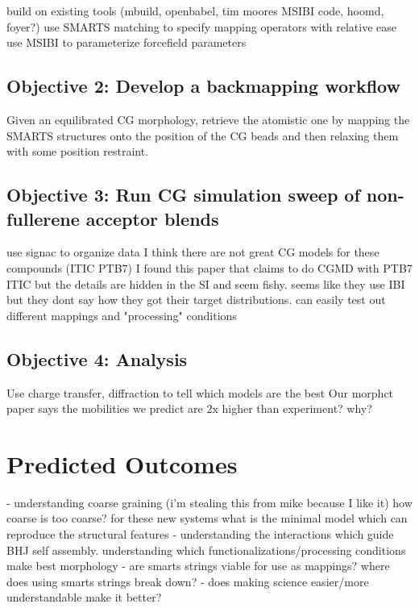 build on existing tools (mbuild, openbabel, tim moores MSIBI code, hoomd, foyer?)
use SMARTS matching to specify mapping operators with relative ease
use MSIBI to parameterize forcefield parameters

\subsection*{Objective 2: Develop a backmapping workflow}

Given an equilibrated CG morphology, retrieve the atomistic one by mapping the SMARTS structures onto the position of the CG beads and then relaxing them with some position restraint. 

\subsection*{Objective 3: Run CG simulation sweep of non-fullerene acceptor blends}

use signac to organize data
I think there are not great CG models for these compounds (ITIC PTB7) I found this paper \cite{Meng2019} that claims to do CGMD with PTB7 ITIC but the details are hidden in the SI and seem fishy. seems like they use IBI but they dont say how they got their target distributions.
can easily test out different mappings and "processing" conditions

\subsection*{Objective 4: Analysis}

Use charge transfer, diffraction to tell which models are the best
Our morphct paper says the mobilities we predict are 2x higher than experiment? why?


\section*{Predicted Outcomes}

- understanding coarse graining (i'm stealing this from mike because I like it) how coarse is too coarse? for these new systems what is the minimal model which can reproduce the structural features
- understanding the interactions which guide BHJ self assembly. understanding which functionalizations/processing conditions make best morphology
- are smarts strings viable for use as mappings? where does using smarts strings break down?
- does making science easier/more understandable make it better? 


